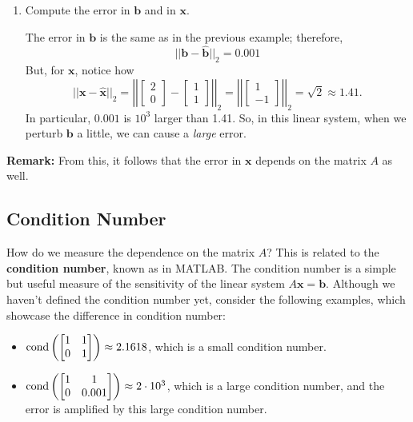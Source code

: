 \documentclass[letterpaper]{article}
\newcommand{\0}{\mathbf{0}}
\renewcommand{\b}{\mathbf{b}}
\newcommand{\x}{\mathbf{x}}
\begin{document}
\begin{mdframed}[nobreak=true]
\begin{enumerate}
        \item Compute the error in $\b$ and in $\x$.
        \begin{mdframed}
            The error in $\b$ is the same as in the previous example; therefore,  
            \[||\b - \hat{\b}||_2 = 0.001\]
            But, for $\x$, notice how 
            \[||\x - \hat{\x}||_2 = \left|\left| \begin{bmatrix}
                2 \\ 0
            \end{bmatrix} - \begin{bmatrix}
                1 \\ 1
            \end{bmatrix} \right|\right|_2 = \left|\left| \begin{bmatrix}
                1 \\ -1
            \end{bmatrix} \right|\right|_2 = \sqrt{2} \approx 1.41.\]
            In particular, $0.001$ is $10^3$ larger than 1.41. So, in this linear system, when we perturb $\b$ a little, we can cause a \emph{large} error. 
        \end{mdframed}
    \end{enumerate}
\end{mdframed}

\textbf{Remark:} From this, it follows that the error in $\x$ depends on the matrix $A$ as well. 


\subsection{Condition Number}
How do we measure the dependence on the matrix $A$? This is related to the \textbf{condition number}, known as  in MATLAB. The condition number is a simple but useful measure of the sensitivity of the linear system $A\x = \b$. Although we haven't defined the condition number yet, consider the following examples, which showcase the difference in condition number: 
\begin{itemize}
    \item $\operatorname{cond}\left(\begin{bmatrix}
        1 & 1 \\ 0 & 1
    \end{bmatrix}\right) \approx 2.1618$, which is a small condition number. 
    
    \item $\operatorname{cond}\left(\begin{bmatrix}
        1 & 1 \\ 0 & 0.001
    \end{bmatrix}\right) \approx 2 \cdot 10^3$, which is a large condition number, and the error is amplified by this large condition number. 
\end{itemize}
\end{document}
